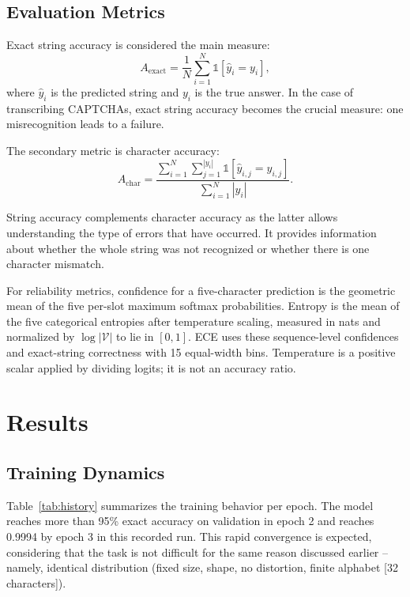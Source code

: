 \documentclass[pdflatex,sn-mathphys-num,iicol]{sn-jnl}
\begin{document}
\subsection{Evaluation Metrics}

Exact string accuracy is considered the main measure:
\begin{equation}
A_{\text{exact}} = \frac{1}{N}\sum_{i=1}^{N}\mathbb{1}[\hat{y}_i = y_i],
\end{equation}
where $\hat{y}_i$ is the predicted string and $y_i$ is the true answer. In the case of transcribing CAPTCHAs, exact string accuracy becomes the crucial measure: one misrecognition leads to a failure.

The secondary metric is character accuracy:
\begin{equation}
A_{\text{char}} = \frac{\sum_{i=1}^{N}\sum_{j=1}^{|y_i|}\mathbb{1}[\hat{y}_{i,j}=y_{i,j}]}{\sum_{i=1}^{N}|y_i|}.
\end{equation}

String accuracy complements character accuracy as the latter allows understanding the type of errors that have occurred. It provides information about whether the whole string was not recognized or whether there is one character mismatch.

For reliability metrics, confidence for a five-character prediction is the geometric mean of the five per-slot maximum softmax probabilities. Entropy is the mean of the five categorical entropies after temperature scaling, measured in nats and normalized by $\log |\mathcal{V}|$ to lie in $[0,1]$. ECE uses these sequence-level confidences and exact-string correctness with 15 equal-width bins. Temperature is a positive scalar applied by dividing logits; it is not an accuracy ratio.
\section{Results}
\label{sec:results}

\subsection{Training Dynamics}

Table~\ref{tab:history} summarizes the training behavior per epoch. The model reaches more than 95\% exact accuracy on validation in epoch 2 and reaches 0.9994 by epoch 3 in this recorded run. This rapid convergence is expected, considering that the task is not difficult for the same reason discussed earlier -- namely, identical distribution (fixed size, shape, no distortion, finite alphabet [32 characters]).
\end{document}
